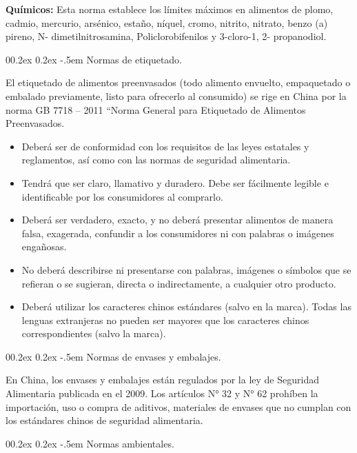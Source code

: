 \documentclass[
  stu,
  floatsintext,
  longtable,
  a4paper,
  nolmodern,
  notxfonts,
  notimes,
  colorlinks=true,linkcolor=blue,citecolor=blue,urlcolor=blue]{apa7}
\makeatletter
\renewcommand{\paragraph}{\@startsection{paragraph}{4}{\parindent}%
	{0\baselineskip \@plus 0.2ex \@minus 0.2ex}%
	{-.5em}%
	{\normalfont\normalsize\bfseries\typesectitle}}
\makeatother
\begin{document}
\textbf{Químicos:} Esta norma establece los límites máximos en alimentos
de plomo, cadmio, mercurio, arsénico, estaño, níquel, cromo, nitrito,
nitrato, benzo (a) pireno, N- dimetilnitrosamina, Policlorobifenilos y
3-cloro-1, 2- propanodiol.

\paragraph{Normas de etiquetado.}\label{normas-de-etiquetado}

El etiquetado de alimentos preenvasados (todo alimento envuelto,
empaquetado o embalado previamente, listo para ofrecerlo al consumido)
se rige en China por la norma GB 7718 -- 2011 ``Norma General para
Etiquetado de Alimentos Preenvasados.

\begin{itemize}
\item
  Deberá ser de conformidad con los requisitos de las leyes estatales y
  reglamentos, así como con las normas de seguridad alimentaria.
\item
  Tendrá que ser claro, llamativo y duradero. Debe ser fácilmente
  legible e identificable por los consumidores al comprarlo.
\item
  Deberá ser verdadero, exacto, y no deberá presentar alimentos de
  manera falsa, exagerada, confundir a los consumidores ni con palabras
  o imágenes engañosas.
\item
  No deberá describirse ni presentarse con palabras, imágenes o símbolos
  que se refieran o se sugieran, directa o indirectamente, a cualquier
  otro producto.
\item
  Deberá utilizar los caracteres chinos estándares (salvo en la marca).
  Todas las lenguas extranjeras no pueden ser mayores que los caracteres
  chinos correspondientes (salvo la marca).
\end{itemize}

\paragraph{Normas de envases y
embalajes.}\label{normas-de-envases-y-embalajes}

En China, los envases y embalajes están regulados por la ley de
Seguridad Alimentaria publicada en el 2009. Los artículos N° 32 y N° 62
prohíben la importación, uso o compra de aditivos, materiales de envases
que no cumplan con los estándares chinos de seguridad alimentaria.

\paragraph{Normas ambientales.}\label{normas-ambientales}
\end{document}
